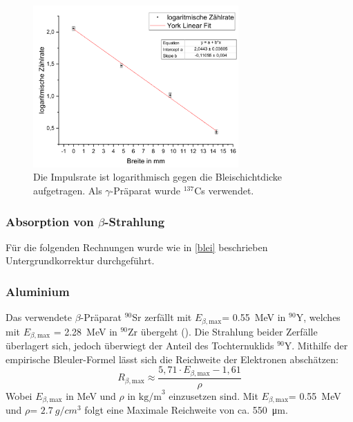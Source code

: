 \documentclass[
	a4paper,
	12pt,
	pagesize,
	ngerman
]{scrartcl}
\begin{document}
	\begin{figure}[H]
		\includegraphics[width=0.7\textwidth]{GammaBlei}
		\centering
		\caption{Die Impulsrate ist logarithmisch gegen die Bleischichtdicke aufgetragen. Als $\gamma$-Präparat wurde $ ^{137}$Cs verwendet.}%
		\label{GammaBlei}
		\centering
	\end{figure}
	
	
	
	\subsubsection{Absorption von $\beta$-Strahlung} 
	Für die folgenden Rechnungen wurde wie in \cref{blei} beschrieben Untergrundkorrektur durchgeführt.
	\subsubsection*{Aluminium}
	Das verwendete $\beta$-Präparat $^{90}$Sr zerfällt mit $E_{\beta,\text{max}}$= \SI{0,55}{MeV} in $^{90}$Y, welches mit $E_{\beta,\text{max}}$ = \SI{2,28}{MeV} in $^{90}$Zr übergeht (\cite{Einfuehrung}).
	Die Strahlung beider Zerfälle überlagert sich, jedoch überwiegt der Anteil des Tochternuklids $^{90}$Y. 
	Mithilfe der empirische Bleuler-Formel lässt sich die Reichweite der Elektronen abschätzen:
	\begin{equation}
		R_{\beta,\text{max}} \approx \frac{5,71 \cdot E_{\beta,\text{max}} - 1,61}{\rho}
		\label{Bleuler}
	\end{equation} %
	Wobei $E_{\beta,\text{max}}$ in MeV und $\rho$ in $\text{kg/m}^3$ einzusetzen sind.
	Mit $E_{\beta,\text{max}}$= \SI{0,55}{MeV} und $\rho$= $\SI{2,7}{g/cm^3}$ folgt eine Maximale Reichweite von ca. \SI{550}{\micro\meter}. 
	
\end{document}
